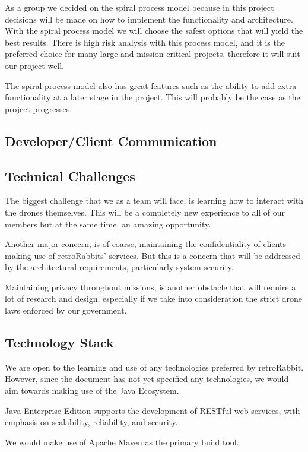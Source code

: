 \documentclass[a4paper,12pt]{article}
\begin{document}
	{\noindent}As a group we decided on the spiral process model because in this project decisions will be made on how to implement the functionality and architecture. With the spiral process model we will choose the safest options that will yield the best results. There is high risk analysis with this process model, and it is the preferred choice for many large and mission critical projects, therefore it will suit our project well.

	{\noindent}The spiral process model also has great features such as the ability to add extra functionality at a later stage in the project. This will probably be the case as the project progresses.

	\subsection{Developer/Client Communication}
	
	\subsection{Technical Challenges}
	The biggest challenge that we as a team will face, is learning how to interact with the drones themselves. This will be a completely new experience to all of our members but at the same time, an amazing opportunity.
	
    {\noindent}Another major concern, is of coarse, maintaining the confidentiality of clients making use of retroRabbits' services. But this is a concern that will be addressed by the architectural requirements, particularly system security.
    
    {\noindent}Maintaining privacy throughout missions, is another obstacle that will require a lot of research and design, especially if we take into consideration the strict drone laws enforced by our government.
    
	\subsection{Technology Stack}
	We are open to the learning and use of any technologies preferred by retroRabbit. However, since the document has not yet specified any technologies, we would aim towards making use of the Java Ecosystem. 
	
	{\noindent}Java Enterprise Edition supports the development of RESTful web services, with emphasis on scalability, reliability, and security.
	
	{\noindent}We would make use of Apache Maven as the primary build tool.
	
\end{document}
